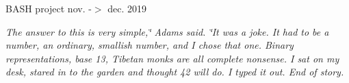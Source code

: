 B\+A\+SH project  nov. -\/$>$ dec. 2019

{\itshape The answer to this is very simple,\char`\"{} Adams said. \char`\"{}It was a joke. It had to be a number, an ordinary, smallish number, and I chose that one. Binary representations, base 13, Tibetan monks are all complete nonsense. I sat on my desk, stared in to the garden and thought 42 will do. I typed it out. End of story.} 
